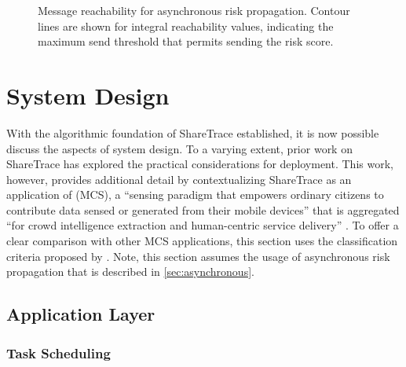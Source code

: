 \begin{figure}[htbp]
\centering
{}
\caption[Message reachability for asynchronous risk propagation]{Message reachability for asynchronous risk propagation. Contour lines are shown for integral reachability values, indicating the maximum send threshold that permits sending the risk score.}
\label{fig:reach}
\end{figure}

\section{System Design}

With the algorithmic foundation of ShareTrace established, it is now possible discuss the aspects of system design. To a varying extent, prior work on ShareTrace \citep[\cref{ch:previous-designs}]{Ayday2020, Ayday2021} has explored the practical considerations for deployment. This work, however, provides additional detail by contextualizing ShareTrace as an application of  (MCS), a ``sensing paradigm that empowers ordinary citizens to contribute data sensed or generated from their mobile devices'' that is aggregated ``for crowd intelligence extraction and human-centric service delivery'' \citep{Guo2015}. To offer a clear comparison with other MCS applications, this section uses the classification criteria proposed by \citet{Capponi2019}. Note, this section assumes the usage of asynchronous risk propagation that is described in \cref{sec:asynchronous}.

\subsection{Application Layer}

\subsubsection{Task Scheduling}


